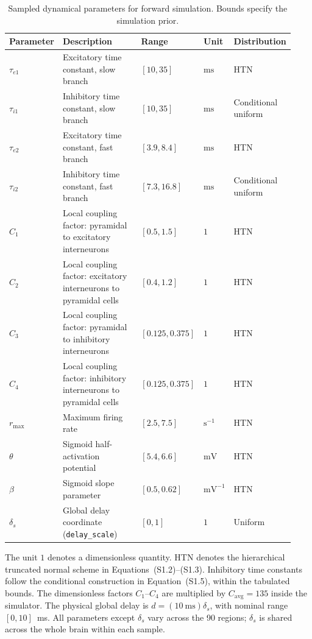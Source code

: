 \documentclass[11pt]{article}
\begin{document}
\begin{table}[t]
\centering
\caption{Sampled dynamical parameters for forward simulation. Bounds specify the simulation prior.}
\label{tab:supp_sampling}
\small
\setlength{\tabcolsep}{4pt}
\begin{tabular}{@{}p{0.10\linewidth}p{0.385\linewidth}p{0.18\linewidth}p{0.09\linewidth}p{0.175\linewidth}@{}}
\toprule
\textbf{Parameter} & \textbf{Description} & \textbf{Range} & \textbf{Unit} & \textbf{Distribution} \\
\midrule
$\tau_{e1}$ & Excitatory time constant, slow branch & $[10,35]$ & $\mathrm{ms}$ & HTN \\
$\tau_{i1}$ & Inhibitory time constant, slow branch & $[10,35]$ & $\mathrm{ms}$ & Conditional uniform \\
$\tau_{e2}$ & Excitatory time constant, fast branch & $[3.9,8.4]$ & $\mathrm{ms}$ & HTN \\
$\tau_{i2}$ & Inhibitory time constant, fast branch & $[7.3,16.8]$ & $\mathrm{ms}$ & Conditional uniform \\
$C_1$ & Local coupling factor: pyramidal to excitatory interneurons & $[0.5,1.5]$ & $1$ & HTN \\
$C_2$ & Local coupling factor: excitatory interneurons to pyramidal cells & $[0.4,1.2]$ & $1$ & HTN \\
$C_3$ & Local coupling factor: pyramidal to inhibitory interneurons & $[0.125,0.375]$ & $1$ & HTN \\
$C_4$ & Local coupling factor: inhibitory interneurons to pyramidal cells & $[0.125,0.375]$ & $1$ & HTN \\
$r_{\max}$ & Maximum firing rate & $[2.5,7.5]$ & $\mathrm{s}^{-1}$ & HTN \\
$\theta$ & Sigmoid half-activation potential & $[5.4,6.6]$ & $\mathrm{mV}$ & HTN \\
$\beta$ & Sigmoid slope parameter & $[0.5,0.62]$ & $\mathrm{mV}^{-1}$ & HTN \\
$\delta_s$ & Global delay coordinate (\texttt{delay\_scale}) & $[0,1]$ & $1$ & Uniform \\
\bottomrule
\end{tabular}
\par\smallskip
\begin{minipage}{\linewidth}
\footnotesize
The unit $1$ denotes a dimensionless quantity. HTN denotes the hierarchical truncated normal scheme in Equations~(S1.2)--(S1.3). Inhibitory time constants follow the conditional construction in Equation~(S1.5), within the tabulated bounds. The dimensionless factors $C_1$--$C_4$ are multiplied by $C_{\mathrm{avg}}=135$ inside the simulator. The physical global delay is $d=(10~\mathrm{ms})\delta_s$, with nominal range $[0,10]$~ms. All parameters except $\delta_s$ vary across the 90 regions; $\delta_s$ is shared across the whole brain within each sample.
\end{minipage}
\end{table}
\end{document}
